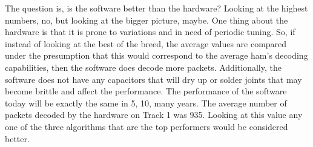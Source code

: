 The question is, is the software better than the hardware? Looking at the highest numbers, no, but looking at the bigger picture, maybe. One thing about the hardware is that it is prone to variations and in need of periodic tuning. So, if instead of looking at the best of the breed, the average values are compared under the presumption that this would correspond to the average ham's decoding capabilities, then the software does decode more packets. Additionally, the software does not have any capacitors that will dry up or solder joints that may become brittle and affect the performance. The performance of the software today will be exactly the same in 5, 10, many years. The average number of packets decoded by the hardware on Track 1 was 935. Looking at this value any one of the three algorithms that are the top performers would be considered better.
